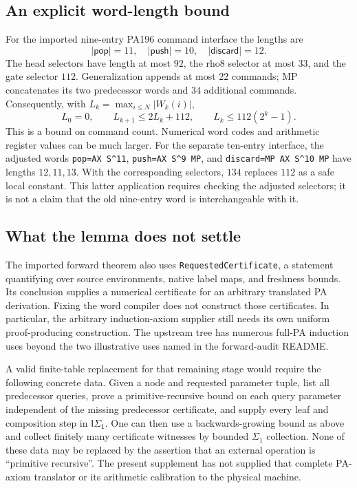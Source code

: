 \documentclass[11pt]{article}
\newcommand{\isone}{\mathsf{I\Sigma_1}}
\begin{document}
\subsection{An explicit word-length bound}
For the imported nine-entry PA196 command interface the lengths are
\[
 |\mathsf{pop}|=11,\quad |\mathsf{push}|=10,\quad
 |\mathsf{discard}|=12.
\]
The head selectors have length at most $92$, the rho8 selector at most $33$,
and the gate selector $112$. Generalization appends at most $22$ commands;
MP concatenates its two predecessor words and $34$ additional commands.
Consequently, with $L_k=\max_{i\le N}|W_k(i)|$,
\[
 L_0=0,\qquad L_{k+1}\le 2L_k+112,\qquad
 L_k\le112(2^k-1).
\]
This is a bound on command count. Numerical word codes and arithmetic
register values can be much larger. For the separate ten-entry interface,
the adjusted words \texttt{pop=AX S\string^11},
\texttt{push=AX S\string^9 MP}, and
\texttt{discard=MP AX S\string^10 MP} have lengths $12,11,13$.
With the corresponding selectors, $134$ replaces $112$ as a safe local
constant. This latter application requires checking the adjusted selectors;
it is not a claim that the old nine-entry word is interchangeable with it.

\subsection{What the lemma does not settle}
The imported forward theorem also uses \texttt{RequestedCertificate}, a
statement quantifying over source environments, native label maps, and
freshness bounds. Its conclusion supplies a numerical certificate for an
arbitrary translated PA derivation. Fixing the word compiler does not
construct those certificates. In particular, the arbitrary induction-axiom
supplier still needs its own uniform proof-producing construction.
The upstream tree has numerous full-PA induction uses beyond the two
illustrative uses named in the forward-audit README.

A valid finite-table replacement for that remaining stage would require
the following concrete data. Given a node and requested parameter tuple,
list all predecessor queries, prove a primitive-recursive bound on each
query parameter independent of the missing predecessor certificate, and
supply every leaf and composition step in $\isone$. One can then use a
backwards-growing bound as above and collect finitely many certificate
witnesses by bounded $\Sigma_1$ collection. None of these data may be
replaced by the assertion that an external operation is ``primitive
recursive''. The present supplement has not supplied that complete
PA-axiom translator or its arithmetic calibration to the physical machine.
\end{document}

